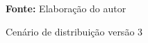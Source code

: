 \begin{figure}[ht!]
\centering

\caption{\textmd{Cenário de distribuição versão 3}}
\label{fig:cenario3}

\par\medskip\textbf{Fonte:} Elaboração do autor \par\medskip
\end{figure}

